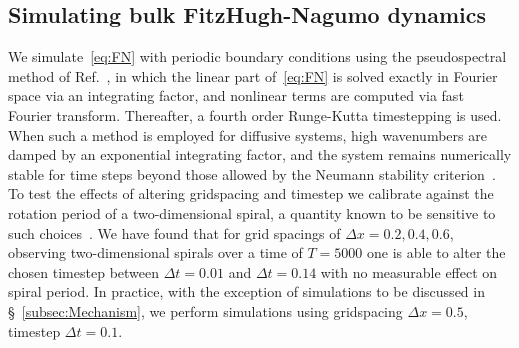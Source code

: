 \subsection{Simulating bulk FitzHugh-Nagumo dynamics}
\label{subsec:Simulation}
We simulate~\eqref{eq:FN} with periodic boundary conditions using the pseudospectral method of Ref.~\citep{Goldstein1996}, in which the linear part of~\eqref{eq:FN} is solved exactly in Fourier space via an integrating factor, and nonlinear terms are computed via fast Fourier transform. Thereafter, a fourth order Runge-Kutta timestepping is used. When such a method is employed for diffusive systems, high wavenumbers are damped by an exponential integrating factor, and the system remains numerically stable for time steps beyond those allowed by the Neumann stability criterion~\citep{Goldstein1996}. To test the effects of altering gridspacing and timestep we calibrate against the rotation period of a two-dimensional spiral, a quantity known to be sensitive to such choices~\citep{Dowle1997}. We have found that for grid spacings of $\Delta x = 0.2,0.4, 0.6$, observing two-dimensional spirals over a time of $T = 5000$ one is able to alter the chosen timestep between $\Delta t = 0.01$ and $\Delta t = 0.14$ with no measurable effect on spiral period. In practice, with the exception of simulations to be discussed in \S~\ref{subsec:Mechanism}, we perform simulations using gridspacing $\Delta x = 0.5$, timestep $\Delta t = 0.1$.

